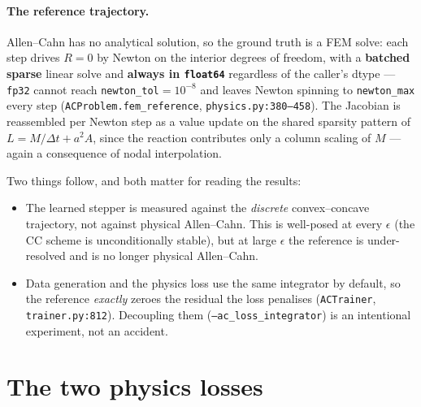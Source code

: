 \documentclass[11pt]{article}
\newcommand{\dt}{\Delta t}
\begin{document}
\paragraph{The reference trajectory.}
Allen--Cahn has no analytical solution, so the ground truth is a FEM solve: each step drives
$R=0$ by Newton on the interior degrees of freedom, with a \textbf{batched sparse} linear solve
and \textbf{always in \texttt{float64}} regardless of the caller's dtype --- \texttt{fp32} cannot
reach \texttt{newton\_tol}$=10^{-8}$ and leaves Newton spinning to \texttt{newton\_max} every step
(\texttt{ACProblem.fem\_reference}, \texttt{physics.py:380--458}). The Jacobian is reassembled per
Newton step as a value update on the shared sparsity pattern of $L=M/\dt+a^2A$, since the reaction
contributes only a column scaling of $M$ --- again a consequence of nodal interpolation.

Two things follow, and both matter for reading the results:
\begin{itemize}
   \item The learned stepper is measured against the \emph{discrete} convex--concave trajectory,
         not against physical Allen--Cahn. This is well-posed at every $\epsilon$ (the CC scheme is
         unconditionally stable), but at large $\epsilon$ the reference is under-resolved and is no
         longer physical Allen--Cahn.
   \item Data generation and the physics loss use the same integrator by default, so the reference
         \emph{exactly} zeroes the residual the loss penalises (\texttt{ACTrainer},
         \texttt{trainer.py:812}). Decoupling them (\texttt{--ac\_loss\_integrator}) is an
         intentional experiment, not an accident.
\end{itemize}

\section{The two physics losses}
\end{document}
